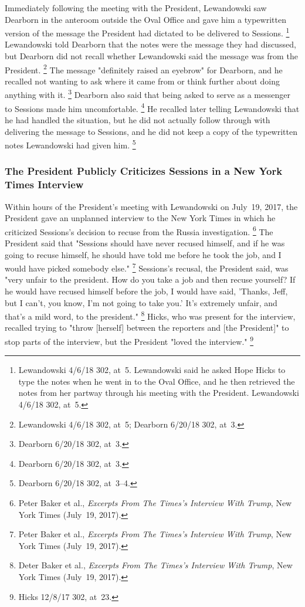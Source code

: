 Immediately following the meeting with the President, Lewandowski saw Dearborn in the anteroom outside the Oval Office and gave him a typewritten version of the message the President had dictated to be delivered to Sessions.%
\footnote{Lewandowski 4/6/18 302, at~5.
Lewandowski said he asked Hope Hicks to type the notes when he went in to the Oval Office, and he then retrieved the notes from her partway through his meeting with the President.
Lewandowski 4/6/18 302, at~5.}
Lewandowski told Dearborn that the notes were the message they had discussed, but Dearborn did not recall whether Lewandowski said the message was from the President.%
\footnote{Lewandowski 4/6/18 302, at~5;
Dearborn 6/20/18 302, at~3.}
The message "definitely raised an eyebrow" for Dearborn, and he recalled not wanting to ask where it came from or think further about doing anything with it.%
\footnote{Dearborn 6/20/18 302, at~3.}
Dearborn also said that being asked to serve as a messenger to Sessions made him uncomfortable.%
\footnote{Dearborn 6/20/18 302, at~3.}
He recalled later telling Lewandowski that he had handled the situation, but he did not actually follow through with delivering the message to Sessions, and he did not keep a copy of the typewritten notes Lewandowski had given him.%
\footnote{Dearborn 6/20/18 302, at~3--4.}

\subsubsection{The President Publicly Criticizes Sessions in a New York Times Interview}

Within hours of the President's meeting with Lewandowski on July~19, 2017, the President gave an unplanned interview to the New York Times in which he criticized Sessions's decision to recuse from the Russia investigation.%
\footnote{Peter Baker et al., \textit{Excerpts From The Times's Interview With Trump}, New York Times (July~19, 2017).}
The President said that "Sessions should have never recused himself, and if he was going to recuse himself, he should have told me before he took the job, and I would have picked somebody else."%
\footnote{Peter Baker et al., \textit{Excerpts From The Times's Interview With Trump}, New York Times (July~19, 2017).}
Sessions's recusal, the President said, was "very unfair to the president.
How do you take a job and then recuse yourself?
If he would have recused himself before the job, I would have said, 'Thanks, Jeff, but I can't, you know, I'm not going to take you.'
It's extremely unfair, and that's a mild word, to the president."%
\footnote{Deter Baker et al., \textit{Excerpts From The Times's Interview With Trump}, New York Times (July~19, 2017).}
Hicks, who was present for the interview, recalled trying to "throw [herself] between the reporters and [the President]" to stop parts of the interview, but the President "loved the interview."%
\footnote{Hicks 12/8/17 302, at~23.}

